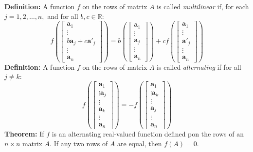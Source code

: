 \documentclass{article}
\newcommand{\bff}[1]{\mathbf{#1}}
\begin{document}
    \begin{minipage}[t]{0.45\linewidth}
        \textbf{Definition:} A function $f$ on the rows of matrix $A$ is called \textit{multilinear} if, for each $j=1,2,\dots,n,$ and for all $b,c\in \mathbb{R}$:
        \begin{equation*}
            f\left(\begin{bmatrix}
                \bff{a}_1 \\ \vdots \\ b\bff{a}_j + c\bff{a'}_j \\ \vdots \\ \bff{a}_n
            \end{bmatrix}\right)=b\left(\begin{bmatrix}
                \bff{a}_1 \\ \vdots \\ \bff{a}_j \\ \vdots \\ \bff{a}_n
            \end{bmatrix}\right)+cf\left(\begin{bmatrix}
                \bff{a}_1 \\ \vdots \\ \bff{a'}_j \\ \vdots \\ \bff{a}_n
            \end{bmatrix}\right)
        \end{equation*}
        \textbf{Definition:} A function $f$ on the rows of matrix $A$ is called \textit{alternating} if for all $j \neq k$:
        \begin{equation*}
            f\left(\begin{bmatrix}
                \bff{a}_1 \\ \vdots \bff{a}_j \\ \vdots \\ \bff{a}_k \\ \vdots \\ \bff{a}_n
            \end{bmatrix}\right) = -f\left(\begin{bmatrix}
                \bff{a}_1 \\ \vdots \bff{a}_k \\ \vdots \\ \bff{a}_j \\ \vdots \\ \bff{a}_n
            \end{bmatrix}\right)
        \end{equation*}
        \textbf{Theorem:} If $f$ is an alternating real-valued function defined pon the rows of an $n\times n$ matrix $A$. If any two rows of $A$ are equal, then $f(A)=0$.
        \vspace{2mm}


\end{minipage}
\end{document}
